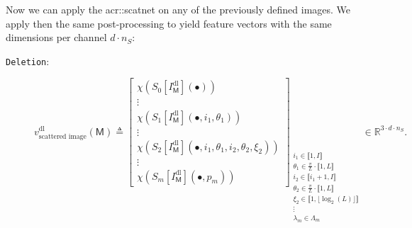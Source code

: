            Now we can apply the \gls{acr::scatnet} on any of the previously defined images.
            We apply then the same post-processing to yield feature vectors with the same dimensions per channel \(d \cdot n_S\):

            \begin{description}
                \item[\texttt{Deletion}:]
                        \begin{equation}
                            \label{eq::deletion_scanetg_image_based_features}
                            v^{\text{dl}}_{\text{scattered image}}\left(\mathsf{M}\right) \triangleq \begin{bmatrix}
                                \chi \left(S_0[I^{\text{dl}}_{\mathsf{M}}]\left(\bullet\right)\right)\\
                                \vdots\\
                                \chi \left(S_1[I^{\text{dl}}_{\mathsf{M}}]\left(\bullet, i_1, \theta_1\right)\right)\\
                                \vdots\\
                                \chi \left(S_2[I^{\text{dl}}_{\mathsf{M}}]\left(\bullet, i_1, \theta_1, i_2, \theta_2, \xi_2\right)\right)\\
                                \vdots\\
                                \chi \left(S_m[I^{\text{dl}}_{\mathsf{M}}]\left(\bullet, p_m\right)\right)
                            \end{bmatrix}_{
                                \substack{
                                    i_1 \in \llbracket 1, I \rrbracket\\
                                    \theta_1 \in \frac{\pi}{L} \cdot \llbracket 1, L \rrbracket\\
                                    i_2 \in \llbracket i_1 + 1, I \rrbracket\\
                                    \theta_2 \in \frac{\pi}{L} \cdot \llbracket 1, L \rrbracket\\
                                    \xi_2 \in \llbracket 1, \lfloor\log_2(L)\rfloor \rrbracket\\
                                    \vdots\\
                                    \lambda_m \in \Lambda_m
                                }
                            } \in \mathbb{R}^{3 \cdot d \cdot n_S}.
                        \end{equation}

\end{description}
